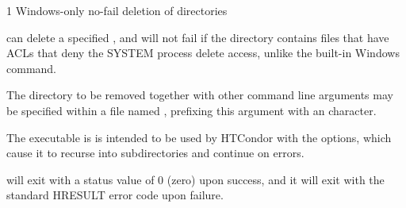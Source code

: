 \begin{ManPage}{\label{man-condor-rmdir}}{1}
{Windows-only no-fail deletion of directories}
\Synopsis
{}




\Description 

 can delete a specified ,
and will not fail if the directory contains files that have ACLs 
that deny the SYSTEM process delete access,
unlike the built-in Windows  command. 

The directory to be removed together with other command line arguments
may be specified within a file named ,
prefixing this argument with an  character.

The  executable is is intended to be used  
by HTCondor with the    options, 
which cause it to recurse into subdirectories and continue on errors.

\begin{Options}










\end{Options}

\ExitStatus

 will exit with a status value of 0 (zero) upon success,
and it will exit with the standard HRESULT error code upon failure.

\end{ManPage}
